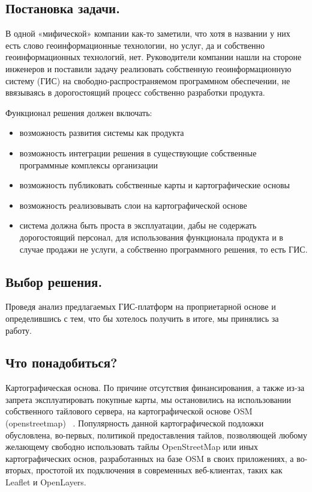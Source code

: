 \documentclass[10pt, a5paper]{article}
\begin{document}
\subsection*{Постановка задачи.}

В одной «мифической» компании как-то заметили, что хотя в названии у них есть слово геоинформационные технологии, но услуг, да и собственно  геоинформационных технологий, нет. Руководители компании нашли на стороне инженеров и поставили задачу реализовать собственную геоинформационную систему (ГИС) на свободно-распространяемом программном обеспечении, не ввязываясь в дорогостоящий процесс собственно разработки продукта.

Функционал решения должен включать:

\begin{itemize}
  \item возможность развития системы как продукта
  \item возможность интеграции решения в существующие собственные программные комплексы организации
  \item возможность публиковать собственные карты и картографические основы
  \item возможность реализовывать слои на картографической основе
  \item система должна быть проста в эксплуатации, дабы не содержать дорогостоящий персонал, для использования функционала продукта и в случае продажи не услуги, а собственно программного решения, то есть ГИС.
\end{itemize}

\subsection*{Выбор решения.}

Проведя анализ предлагаемых ГИС-платформ на проприетарной основе и определившись с тем, что бы хотелось получить в итоге, мы принялись за работу.

\subsection*{Что понадобиться?}

Картографическая основа. По причине отсутствия финансирования, а также из-за запрета эксплуатировать покупные карты, мы остановились на использовании собственного тайлового сервера, на картографической основе OSM (openstreetmap) ~\cite{Stepanov-7}. Популярность данной картографической подложки обусловлена,  во-первых, политикой предоставления тайлов, позволяющей любому желающему свободно использовать тайлы OpenStreetMap или иных картографических основ, разработанных на базе OSM в своих приложениях, а во-вторых, простотой их подключения в современных веб-клиентах, таких как Leaflet и OpenLayers.
\end{document}
